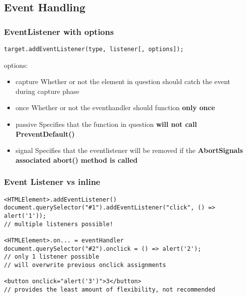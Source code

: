 \documentclass[main.tex,fontsize=6pt,paper=a4,paper=landscape,DIV=calc,]{scrartcl}
\begin{document}
\begin{multicols*}{4}
\subsection{Event Handling}

\subsubsection{EventListener with options}  
\vspace{-2mm}
\begin{lstlisting}
target.addEventListener(type, listener[, options]);
\end{lstlisting}
\vspace{2mm}
options:
\begin{itemize}
  \item capture \newline
    Whether or not the element in question should catch the event during capture phase
  \item once \newline
    Whether or not the eventhandler should function \textbf{only once}
  \item passive \newline
    Specifies that the function in question \textbf{will not call PreventDefault()}
  \item signal \newline 
    Specifies that the eventlistener will be removed if the \textbf{AbortSignals associated abort() method is called}
  
\end{itemize}

\subsubsection{Event Listener vs inline}  
\vspace{-2mm}
\begin{lstlisting}
<HTMLElement>.addEventListener()
document.querySelector("#1").addEventListener("click", () => alert('1'));
// multiple listeners possible!

<HTMLElement>.on... = eventHandler
document.querySelector("#2").onclick = () => alert('2');
// only 1 listener possible
// will overwrite previous onclick assignments

<button onclick="alert('3')">3</button>
// provides the least amount of flexibility, not recommended
\end{lstlisting}
\vspace{2mm}


\end{multicols*}
\end{document}
